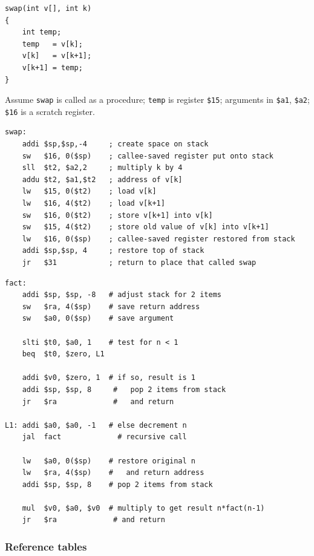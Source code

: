 \begin{eg}
\leavevmode
\begin{lstlisting}
swap(int v[], int k)
{
    int temp;
    temp   = v[k];
    v[k]   = v[k+1];
    v[k+1] = temp;
}
\end{lstlisting}
Assume \texttt{swap} is called as a procedure; \texttt{temp} is register
\texttt{\$15}; arguments in \texttt{\$a1}, \texttt{\$a2}; \texttt{\$16} is a
scratch register.

\begin{lstlisting}
swap:
    addi $sp,$sp,-4     ; create space on stack
    sw   $16, 0($sp)    ; callee-saved register put onto stack
    sll  $t2, $a2,2     ; multiply k by 4
    addu $t2, $a1,$t2   ; address of v[k]
    lw   $15, 0($t2)    ; load v[k]
    lw   $16, 4($t2)    ; load v[k+1]
    sw   $16, 0($t2)    ; store v[k+1] into v[k]
    sw   $15, 4($t2)    ; store old value of v[k] into v[k+1]
    lw   $16, 0($sp)    ; callee-saved register restored from stack
    addi $sp,$sp, 4     ; restore top of stack
    jr   $31            ; return to place that called swap
\end{lstlisting}
\end{eg}

\begin{eg}
\leavevmode
\begin{lstlisting}
fact:
    addi $sp, $sp, -8   # adjust stack for 2 items
    sw   $ra, 4($sp)    # save return address
    sw   $a0, 0($sp)    # save argument

    slti $t0, $a0, 1    # test for n < 1
    beq  $t0, $zero, L1

    addi $v0, $zero, 1  # if so, result is 1
    addi $sp, $sp, 8     #   pop 2 items from stack
    jr   $ra             #   and return

L1: addi $a0, $a0, -1   # else decrement n
    jal  fact             # recursive call

    lw   $a0, 0($sp)    # restore original n
    lw   $ra, 4($sp)    #   and return address
    addi $sp, $sp, 8    # pop 2 items from stack

    mul  $v0, $a0, $v0  # multiply to get result n*fact(n-1)
    jr   $ra             # and return
\end{lstlisting}
\end{eg}

\subsubsection{Reference tables}

